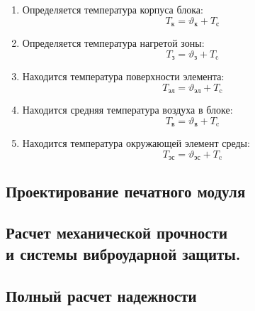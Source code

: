 \begin{enumerate}
\item Определяется температура корпуса блока:
    \begin{equation}
      T\mathrm{_к} = \vartheta\mathrm{_{к}} + T\mathrm{_с}
    \end{equation}

\item Определяется температура нагретой зоны:
    \begin{equation}
      T\mathrm{_з} = \vartheta\mathrm{_з} + T\mathrm{_c}
    \end{equation}


\item Находится температура поверхности элемента:
    \begin{equation}
      T\mathrm{_{эл}} = \vartheta\mathrm{_{эл}} + T\mathrm{_c}
    \end{equation}



\item Находится средняя температура воздуха в блоке:
    \begin{equation}
      T\mathrm{_{в}} = \vartheta\mathrm{_{в}} + T\mathrm{_c}
    \end{equation}



\item Находится температура окружающей элемент среды:
    \begin{equation}
      T\mathrm{_{эс}} = \vartheta\mathrm{_{эс}} + T\mathrm{_c}
    \end{equation}

\end{enumerate}
 

 

\subsection{Проектирование печатного модуля}

% 
% 

\subsection{Расчет механической прочности \\
  и системы виброударной защиты.}

\subsection{Полный расчет надежности}

\newpage

